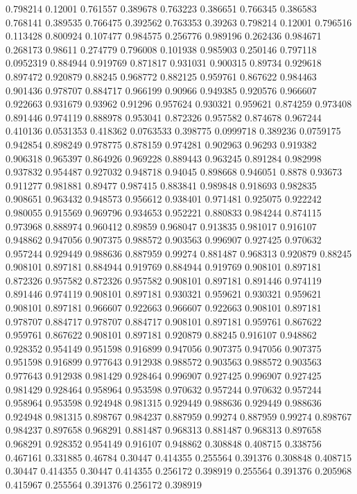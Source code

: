0.798214 0.12001
0.761557 0.389678
0.763223 0.386651
0.766345 0.386583
0.768141 0.389535
0.766475 0.392562
0.763353 0.39263
0.798214 0.12001
0.796516 0.113428
0.800924 0.107477
0.984575 0.256776
0.989196 0.262436
0.984671 0.268173
0.98611 0.274779
0.796008 0.101938
0.985903 0.250146
0.797118 0.0952319
0.884944 0.919769
0.871817 0.931031
0.900315 0.89734
0.929618 0.897472
0.920879 0.88245
0.968772 0.882125
0.959761 0.867622
0.984463 0.901436
0.978707 0.884717
0.966199 0.90966
0.949385 0.920576
0.966607 0.922663
0.931679 0.93962
0.91296 0.957624
0.930321 0.959621
0.874259 0.973408
0.891446 0.974119
0.888978 0.953041
0.872326 0.957582
0.874678 0.967244
0.410136 0.0531353
0.418362 0.0763533
0.398775 0.0999718
0.389236 0.0759175
0.942854 0.898249
0.978775 0.878159
0.974281 0.902963
0.96293 0.919382
0.906318 0.965397
0.864926 0.969228
0.889443 0.963245
0.891284 0.982998
0.937832 0.954487
0.927032 0.948718
0.94045 0.898668
0.946051 0.8878
0.93673 0.911277
0.981881 0.89477
0.987415 0.883841
0.989848 0.918693
0.982835 0.908651
0.963432 0.948573
0.956612 0.938401
0.971481 0.925075
0.922242 0.980055
0.915569 0.969796
0.934653 0.952221
0.880833 0.984244
0.874115 0.973968
0.888974 0.960412
0.89859 0.968047
0.913835 0.981017
0.916107 0.948862
0.947056 0.907375
0.988572 0.903563
0.996907 0.927425
0.970632 0.957244
0.929449 0.988636
0.887959 0.99274
0.881487 0.968313
0.920879 0.88245
0.908101 0.897181
0.884944 0.919769
0.884944 0.919769
0.908101 0.897181
0.872326 0.957582
0.872326 0.957582
0.908101 0.897181
0.891446 0.974119
0.891446 0.974119
0.908101 0.897181
0.930321 0.959621
0.930321 0.959621
0.908101 0.897181
0.966607 0.922663
0.966607 0.922663
0.908101 0.897181
0.978707 0.884717
0.978707 0.884717
0.908101 0.897181
0.959761 0.867622
0.959761 0.867622
0.908101 0.897181
0.920879 0.88245
0.916107 0.948862
0.928352 0.954149
0.951598 0.916899
0.947056 0.907375
0.947056 0.907375
0.951598 0.916899
0.977643 0.912938
0.988572 0.903563
0.988572 0.903563
0.977643 0.912938
0.981429 0.928464
0.996907 0.927425
0.996907 0.927425
0.981429 0.928464
0.958964 0.953598
0.970632 0.957244
0.970632 0.957244
0.958964 0.953598
0.924948 0.981315
0.929449 0.988636
0.929449 0.988636
0.924948 0.981315
0.898767 0.984237
0.887959 0.99274
0.887959 0.99274
0.898767 0.984237
0.897658 0.968291
0.881487 0.968313
0.881487 0.968313
0.897658 0.968291
0.928352 0.954149
0.916107 0.948862
0.308848 0.408715
0.338756 0.467161
0.331885 0.46784
0.30447 0.414355
0.255564 0.391376
0.308848 0.408715
0.30447 0.414355
0.30447 0.414355
0.256172 0.398919
0.255564 0.391376
0.205968 0.415967
0.255564 0.391376
0.256172 0.398919
